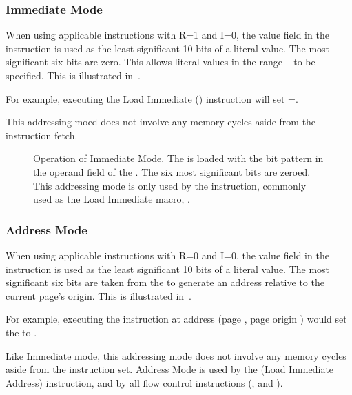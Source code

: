 \subsubsection{Immediate Mode}
\label{sec:immediate-mode}

When using applicable instructions with R=1 and I=0, the value field
in the instruction is used as the least significant 10 bits of a
literal value. The most significant six bits are zero. This allows
literal values in the range – to be
specified. This is illustrated in~.

For example, executing the Load Immediate () instruction  will set \A=.

This addressing moed does not involve any memory cycles aside from the
instruction fetch.



\begin{figure}[htb]
 \centering
\caption[Immediate Mode]{\label{fig:immediate-mode} Operation of Immediate
  Mode. The \AC{} is loaded with the bit pattern in the operand field of the
  \IR. The six most significant bits are zeroed. This addressing mode is only
  used by the  instruction, commonly used as the Load Immediate
  macro, .}
\end{figure}





\subsubsection{Address Mode}
\label{sec:address-mode}

When using applicable instructions with R=0 and I=0, the value field in the
instruction is used as the least significant 10 bits of a literal value. The
most significant six bits are taken from the \PC to generate an address
relative to the current page's origin. This is illustrated
in~.

For example, executing the instruction  at address  (page
, page origin ) would set the \PC{} to .

Like Immediate mode, this addressing mode does not involve any memory cycles
aside from the instruction set. Address Mode is used by the  (Load
Immediate Address) instruction, and by all flow control instructions
(,  and ).



